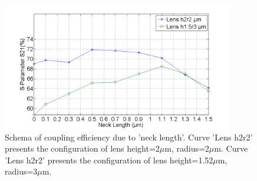 \begin{figure}[!ht]
\centering
\includegraphics[width=0.9\textwidth]{bilder/s21_neck}
\caption {Schema of coupling efficiency due to 'neck length'. Curve 'Lens h2r2' presents the configuration of lens height=2$\mu$m, radius=2$\mu$m. Curve 'Lens h2r2' presents the configuration of lens height=1.52$\mu$m, radius=3$\mu$m.}
\label{fig:s21_neck}
\end{figure}
